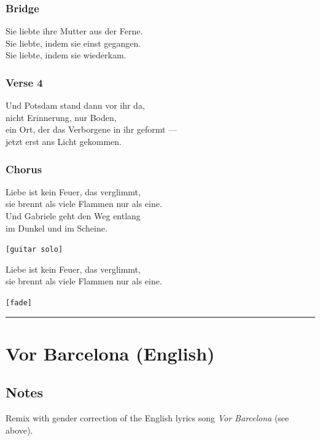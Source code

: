 \subsubsection{Bridge}\label{bridge-6}

Sie liebte ihre Mutter aus der Ferne.\\
Sie liebte, indem sie einst gegangen.\\
Sie liebte, indem sie wiederkam.

\subsubsection{Verse 4}\label{verse-4-2}

Und Potsdam stand dann vor ihr da,\\
nicht Erinnerung, nur Boden,\\
ein Ort, der das Verborgene in ihr geformt ---\\
jetzt erst ans Licht gekommen.

\subsubsection{Chorus}\label{chorus-19}

Liebe ist kein Feuer, das verglimmt,\\
sie brennt als viele Flammen nur als eine.\\
Und Gabriele geht den Weg entlang\\
im Dunkel und im Scheine.

\texttt{{[}guitar\ solo{]}}

Liebe ist kein Feuer, das verglimmt,\\
sie brennt als viele Flammen nur als eine.

\texttt{{[}fade{]}}

\begin{center}\rule{0.5\linewidth}{0.5pt}\end{center}

\section{Vor Barcelona (English)}\label{vor-barcelona-english}

\subsection{Notes}\label{notes-10}

Remix with gender correction of the English lyrics song \emph{Vor
Barcelona} (see above).

